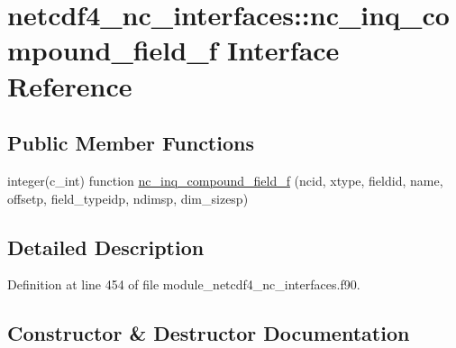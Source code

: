 \hypertarget{interfacenetcdf4__nc__interfaces_1_1nc__inq__compound__field__f}{}\section{netcdf4\+\_\+nc\+\_\+interfaces\+:\+:nc\+\_\+inq\+\_\+compound\+\_\+field\+\_\+f Interface Reference}
\label{interfacenetcdf4__nc__interfaces_1_1nc__inq__compound__field__f}
\subsection*{Public Member Functions}
\begin{DoxyCompactItemize}
\item 
integer(c\+\_\+int) function \hyperlink{interfacenetcdf4__nc__interfaces_1_1nc__inq__compound__field__f_accd4f979d0c58c99196b36ede295a186}{nc\+\_\+inq\+\_\+compound\+\_\+field\+\_\+f} (ncid, xtype, fieldid, name, offsetp, field\+\_\+typeidp, ndimsp, dim\+\_\+sizesp)
\end{DoxyCompactItemize}


\subsection{Detailed Description}


Definition at line 454 of file module\+\_\+netcdf4\+\_\+nc\+\_\+interfaces.\+f90.



\subsection{Constructor \& Destructor Documentation}
\mbox{\label{interfacenetcdf4__nc__interfaces_1_1nc__inq__compound__field__f_accd4f979d0c58c99196b36ede295a186}} 
